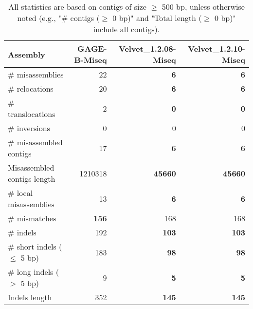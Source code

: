 \documentclass[12pt,a4paper]{article}
\begin{document}
\begin{table}[ht]
\begin{center}
\caption{All statistics are based on contigs of size $\geq$ 500 bp, unless otherwise noted (e.g., "\# contigs ($\geq$ 0 bp)" and "Total length ($\geq$ 0 bp)" include all contigs).}
\begin{tabular}{|l*{3}{|r}|}
\hline
Assembly & GAGE-B-Miseq & Velvet\_1.2.08-Miseq & Velvet\_1.2.10-Miseq \\ \hline
\# misassemblies & 22 & {\bf 6} & {\bf 6} \\ \hline
\hspace{5mm}\# relocations & 20 & {\bf 6} & {\bf 6} \\ \hline
\hspace{5mm}\# translocations & 2 & {\bf 0} & {\bf 0} \\ \hline
\hspace{5mm}\# inversions & 0 & 0 & 0 \\ \hline
\# misassembled contigs & 17 & {\bf 6} & {\bf 6} \\ \hline
Misassembled contigs length & 1210318 & {\bf 45660} & {\bf 45660} \\ \hline
\# local misassemblies & 13 & {\bf 6} & {\bf 6} \\ \hline
\# mismatches & {\bf 156} & 168 & 168 \\ \hline
\# indels & 192 & {\bf 103} & {\bf 103} \\ \hline
\hspace{5mm}\# short indels ($\leq$ 5 bp) & 183 & {\bf 98} & {\bf 98} \\ \hline
\hspace{5mm}\# long indels ($>$ 5 bp) & 9 & {\bf 5} & {\bf 5} \\ \hline
Indels length & 352 & {\bf 145} & {\bf 145} \\ \hline
\end{tabular}
\end{center}
\end{table}
\end{document}
